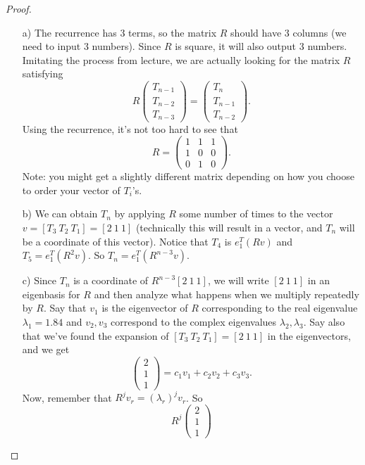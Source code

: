 \documentclass{article}
\theoremstyle{definition}
\begin{document}
\begin{proof}
	\begin{itemize}
		\item[a)] The recurrence has 3 terms, so the matrix $R$ should have 3 columns (we need to input 3 numbers). Since $R$ is square, it will also output 3 numbers. Imitating the process from lecture, we are actually looking for the matrix $R$ satisfying
		\[R\begin{pmatrix}
			T_{n-1}\\ T_{n-2}\\T_{n-3}
		\end{pmatrix}=\begin{pmatrix}
		T_{n}\\ T_{n-1}\\T_{n-2}
	\end{pmatrix}. \]
Using the recurrence, it's not too hard to see that
\[R=\begin{pmatrix}
	1 & 1 & 1\\
	1 & 0 & 0\\
	0 & 1 & 0
\end{pmatrix}.\]
Note: you might get a slightly different matrix depending on how you choose to order your vector of $T_i$'s.
\item[b)] We can obtain $T_n$ by applying $R$ some number of times to the vector $v=[T_3 \ T_2 \ T_1]=[2 \ 1\ 1]$ (technically this will result in a vector, and $T_n$ will be a coordinate of this vector). Notice that $T_4$ is $e_1^T (Rv)$ and $T_5=e_1^T(R^2 v)$. So $T_n= e_1^T (R^{n-3}v)$.
\item[c)] Since $T_n$ is a coordinate of $R^{n-3} [2 \ 1\ 1]$, we will write $[2\ 1\ 1]$ in an eigenbasis for $R$ and then analyze what happens when we multiply repeatedly by $R$. Say that $v_1$ is the eigenvector of $R$ corresponding to the real eigenvalue $\lambda_1=1.84$ and $v_2, v_3$ correspond to the complex eigenvalues $\lambda_2, \lambda_3$. %
Say also that we've found the expansion of $[T_3 \ T_2 \ T_1]=[2 \ 1\ 1]$ in the eigenvectors, and we get
\[\begin{pmatrix}
	2 \\ 1\\ 1
\end{pmatrix}= c_1 v_1 + c_2 v_2 + c_3 v_3.\]
Now, remember that $R^j v_r= (\lambda_r)^j v_r$. So 
\[R^j\begin{pmatrix}
	2 \\ 1\\ 1

\end{pmatrix}\]
\end{itemize}
\end{proof}
\end{document}
